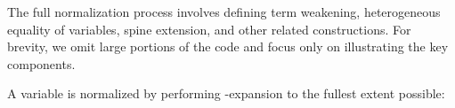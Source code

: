 The full normalization process involves defining term weakening, heterogeneous equality of variables, spine extension, and other related constructions. For brevity, we omit large portions of the code and focus only on illustrating the key components.

A variable is normalized by performing \eta-expansion to the fullest extent possible:

\begin{code}%
\>[0]\<%
\\
\>[0][@{}l@{\AgdaIndent{0}}]%
\>[2]\AgdaSpace{}%
\AgdaSymbol{:}\AgdaSpace{}%
\AgdaSpace{}%
\AgdaSpace{}%
\AgdaSpace{}%
\AgdaSpace{}%
\AgdaSpace{}%
\AgdaSpace{}%
\<%
\\
%
\>[2]\AgdaSpace{}%
\AgdaSpace{}%
\AgdaSymbol{=}\AgdaSpace{}%
\AgdaSpace{}%
\AgdaSymbol{(}\AgdaSpace{}%
\AgdaOperator{\AgdaInductiveConstructor{,}}\AgdaSpace{}%
\AgdaSymbol{)}\<%
\\
%
\\[\AgdaEmptyExtraSkip]%
%
\>[2]\AgdaSpace{}%
\AgdaSymbol{:}\AgdaSpace{}%
\AgdaSpace{}%
\AgdaSpace{}%
\AgdaSpace{}%
\AgdaSpace{}%
\AgdaSpace{}%
\AgdaSpace{}%
\<%
\\
%
\>[2]\AgdaSpace{}%
\AgdaSymbol{\{}\AgdaSpace{}%
\AgdaSymbol{=}\AgdaSpace{}%
\AgdaInductiveConstructor{*}\AgdaSymbol{\}}\AgdaSpace{}%
\AgdaSpace{}%
\AgdaSymbol{=}\AgdaSpace{}%
\AgdaSpace{}%
\<%
\\
%
\>[2]\AgdaSpace{}%
\AgdaSymbol{\{}\AgdaSpace{}%
\AgdaSymbol{=}\AgdaSpace{}%
\AgdaSpace{}%
\AgdaSpace{}%
\AgdaSymbol{\}}\AgdaSpace{}%
\AgdaSymbol{(}\AgdaSpace{}%
\AgdaOperator{\AgdaInductiveConstructor{,}}\AgdaSpace{}%
\AgdaSymbol{)}\AgdaSpace{}%
\AgdaSymbol{=}\<%
\\
\>[2][@{}l@{\AgdaIndent{0}}]%
\>[4]\AgdaSpace{}%
\AgdaSymbol{(}\AgdaSpace{}%
\AgdaSymbol{\{}\AgdaSpace{}%
\AgdaSymbol{=}\AgdaSpace{}%
\AgdaSymbol{\}}\AgdaSpace{}%
\AgdaSymbol{(}\AgdaSpace{}%
\AgdaSpace{}%
\AgdaOperator{\AgdaInductiveConstructor{,}}\AgdaSpace{}%
\AgdaSpace{}%
\AgdaSymbol{(}\AgdaSpace{}%
\AgdaSpace{}%
\AgdaSymbol{)}\AgdaSpace{}%
\AgdaSymbol{(}\AgdaSpace{}%
\AgdaSymbol{)))}\<%
\end{code}

